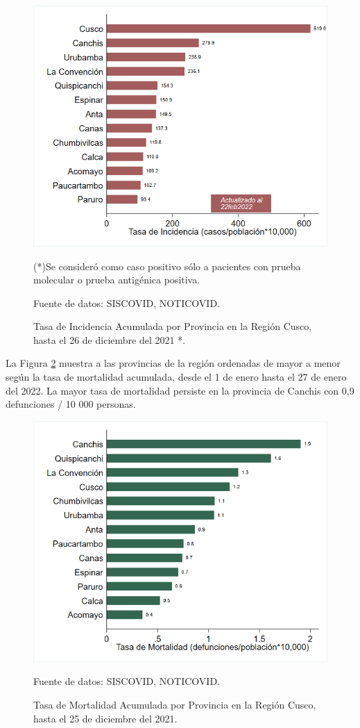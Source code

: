 \documentclass[12pt,a4paper,openany]{book}
\begin{document}
\begin{figure}[!htpb]
	\caption{Tasa de Incidencia Acumulada por Provincia en la Región Cusco, hasta el 26 de diciembre del 2021 *. }\label{fig:incidencia_provincias}
	\begin{center}
		\includegraphics[width=0.75\linewidth]{../figuras/incidencia_provincial_2022.png}
	\end{center}
	{\footnotesize {(*)Se consideró como caso positivo sólo a pacientes con prueba molecular o prueba antigénica positiva. 
			
	Fuente de datos: SISCOVID, NOTICOVID.}}
\end{figure}


La Figura \ref{fig:mortalidad_ordenada} muestra a las provincias de la región ordenadas de mayor a menor según la tasa de mortalidad acumulada, desde el 1 de enero hasta el 27 de enero del 2022. La mayor tasa de mortalidad persiste en la provincia de Canchis con 0,9 defunciones / 10 000 personas.   

\begin{figure}[h]
	\caption{Tasa de Mortalidad Acumulada por Provincia en la Región Cusco, hasta el 25 de diciembre del 2021. }\label{fig:mortalidad_ordenada}
	\begin{center}
		\includegraphics[width=0.65\linewidth]{../figuras/mortalidad_provincial_2022.png}
	\end{center}
	{\footnotesize {Fuente de datos: SISCOVID, NOTICOVID.}}
\end{figure}
\end{document}
